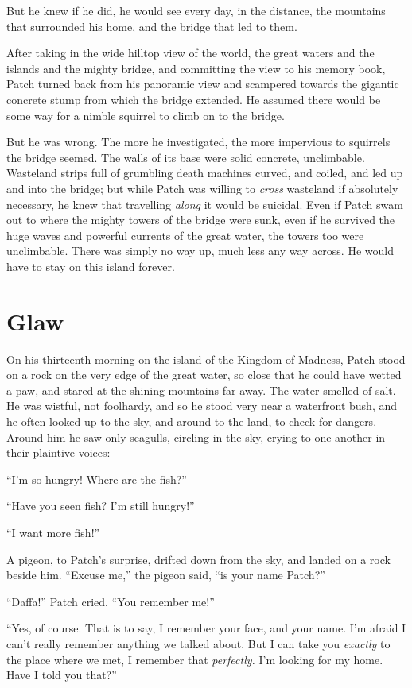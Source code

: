 \documentclass[12pt]{memoir}
\begin{document}
But he knew if he did, he would see every day, in the distance, the
mountains that surrounded his home, and the bridge that led to them.

After taking in the wide hilltop view of the world, the great waters
and the islands and the mighty bridge, and committing the view to his
memory book, Patch turned back from his panoramic view and scampered
towards the gigantic concrete stump from which the bridge extended. He
assumed there would be some way for a nimble squirrel to climb on to
the bridge.

But he was wrong. The more he investigated, the more impervious to
squirrels the bridge seemed. The walls of its base were solid
concrete, unclimbable. Wasteland strips full of grumbling death
machines curved, and coiled, and led up and into the bridge; but while
Patch was willing to \textit{cross} wasteland if absolutely necessary,
he knew that travelling \textit{along} it would be suicidal. Even if
Patch swam out to where the mighty towers of the bridge were sunk,
even if he survived the huge waves and powerful currents of the great
water, the towers too were unclimbable. There was simply no way up,
much less any way across. He would have to stay on this island
forever.


\section{Glaw}

On his thirteenth morning on the island of the Kingdom of Madness,
Patch stood on a rock on the very edge of the great water, so close
that he could have wetted a paw, and stared at the shining mountains
far away. The water smelled of salt. He was wistful, not foolhardy,
and so he stood very near a waterfront bush, and he often looked up to
the sky, and around to the land, to check for dangers. Around him he
saw only seagulls, circling in the sky, crying to one another in their
plaintive voices:

“I’m so hungry! Where are the fish?”

“Have you seen fish? I’m still hungry!”

“I want more fish!”

A pigeon, to Patch’s surprise, drifted down from the sky, and landed
on a rock beside him. “Excuse me,” the pigeon said, “is your name
Patch?”

“Daffa!” Patch cried. “You remember me!”

“Yes, of course. That is to say, I remember your face, and your
name. I’m afraid I can’t really remember anything we talked about. But
I can take you \textit{exactly} to the place where we met, I remember
that \textit{perfectly.} I’m looking for my home. Have I told you
that?”
\end{document}
